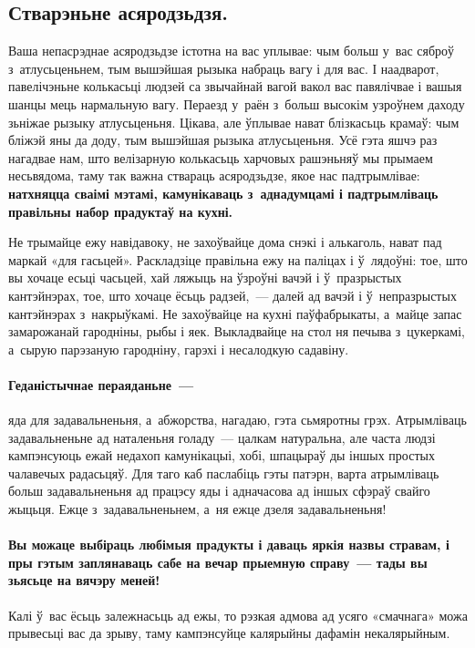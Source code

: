 \subsection*{Стварэньне асяродзьдзя.}
Ваша непасрэднае асяродзьдзе істотна на вас уплывае: чым больш у~вас сяброў з~атлусьценьнем, тым вышэйшая рызыка набраць вагу і для вас. І наадварот, павелічэньне колькасьці людзей са звычайнай вагой вакол вас павялічвае і вашыя шанцы мець нармальную вагу. Пераезд у~раён з~больш высокім узроўнем даходу зьніжае рызыку атлусьценьня. Цікава, але ўплывае нават блізкасьць крамаў: чым бліжэй яны да доду, тым вышэйшая рызыка атлусьценьня. Усё гэта яшчэ раз нагадвае нам, што велізарную колькасьць харчовых рашэньняў мы прымаем несьвядома, таму так важна ствараць асяродзьдзе, якое нас падтрымлівае: \textbf{натхняцца сваімі мэтамі, камунікаваць з~аднадумцамі і падтрымліваць правільны набор прадуктаў на кухні.}

Не трымайце ежу навідавоку, не захоўвайце дома снэкі і алькаголь, нават пад маркай «для гасьцей». Раскладзіце правільна ежу на паліцах і ў~лядоўні: тое, што вы хочаце есьці часьцей, хай ляжыць на ўзроўні вачэй і ў~празрыстых кантэйнэрах, тое, што хочаце ёсьць радзей,~--- далей ад вачэй і ў~непразрыстых кантэйнэрах з~накрыўкамі. Не захоўвайце на кухні паўфабрыкаты, а~майце запас замарожанай гародніны, рыбы і яек. Выкладвайце на стол ня печыва з~цукеркамі, а~сырую парэзаную гародніну, гарэхі і несалодкую садавіну. 


\paragraph{Геданістычнае пераяданьне~---} яда для задавальненьня, а~абжорства, нагадаю, гэта сьмяротны грэх. Атрымліваць задавальненьне ад наталеньня голаду~--- цалкам натуральна, але часта людзі кампэнсуюць ежай недахоп камунікацыі, хобі, шпацыраў ды іншых простых чалавечых радасьцяў. Для таго каб паслабіць гэты патэрн, варта атрымліваць больш задавальненьня ад працэсу яды і адначасова ад іншых сфэраў свайго жыцьця. Ежце з~задавальненьнем, а~ня ежце дзеля задавальненьня!

\paragraph{Вы можаце выбіраць любімыя прадукты і даваць яркія назвы стравам, і пры гэтым заплянаваць сабе на вечар прыемную справу~--- тады вы зьясьце на вячэру меней!} Калі ў~вас ёсьць залежнасьць ад ежы, то рэзкая адмова ад усяго «смачнага» можа прывесьці вас да зрыву, таму кампэнсуйце калярыйны дафамін некалярыйным.

